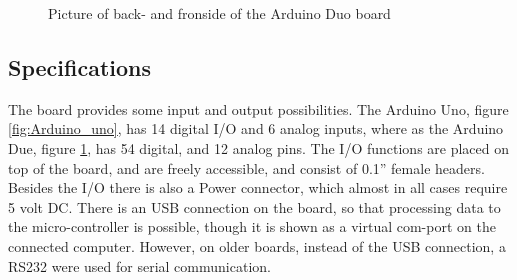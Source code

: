 \par
{}
\hfill
{}
\begin{figure}[H]
\caption{Picture of back- and fronside of the Arduino Duo board \cite{Arduino:board_pics}}
\label{fig:Arduino_duo}
\end{figure}
\par

\subsection*{Specifications}
The board provides some input and output possibilities. The Arduino Uno, figure \ref{fig:Arduino_uno}, has 14 digital I/O and 6 analog inputs, where as the Arduino Due, figure \ref{fig:Arduino_duo}, has 54 digital, and 12 analog pins. The I/O functions are placed on top of the board, and are freely accessible, and consist of 0.1'' female headers. Besides the I/O there is also a Power connector, which almost in all cases require 5 volt DC. There is an USB connection on the board, so that processing data to the micro-controller is possible, though it is shown as a virtual com-port on the connected computer. However, on older boards, instead of the USB connection, a RS232 were used for serial communication. 

